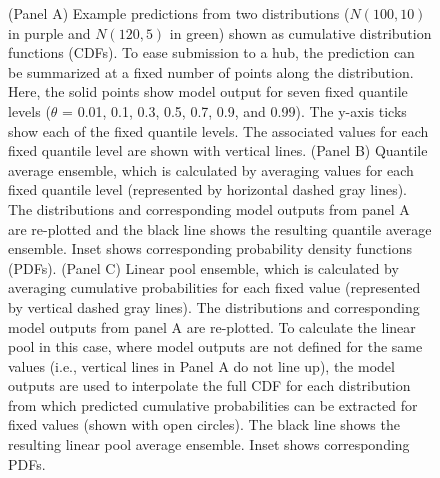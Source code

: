 \documentclass[
  letterpaper,
  DIV=11,
  numbers=noendperiod]{scrartcl}
\begin{document}
\begin{figure}


\caption{\label{fig-example-quantile-average-and-linear-pool}(Panel A)
Example predictions from two distributions (\(N(100, 10)\) in purple and
\(N(120, 5)\) in green) shown as cumulative distribution functions
(CDFs). To ease submission to a hub, the prediction can be summarized at
a fixed number of points along the distribution. Here, the solid points
show model output for seven fixed quantile levels (\(\theta\) = 0.01,
0.1, 0.3, 0.5, 0.7, 0.9, and 0.99). The y-axis ticks show each of the
fixed quantile levels. The associated values for each fixed quantile
level are shown with vertical lines. (Panel B) Quantile average
ensemble, which is calculated by averaging values for each fixed
quantile level (represented by horizontal dashed gray lines). The
distributions and corresponding model outputs from panel A are
re-plotted and the black line shows the resulting quantile average
ensemble. Inset shows corresponding probability density functions
(PDFs). (Panel C) Linear pool ensemble, which is calculated by averaging
cumulative probabilities for each fixed value (represented by vertical
dashed gray lines). The distributions and corresponding model outputs
from panel A are re-plotted. To calculate the linear pool in this case,
where model outputs are not defined for the same values (i.e., vertical
lines in Panel A do not line up), the model outputs are used to
interpolate the full CDF for each distribution from which predicted
cumulative probabilities can be extracted for fixed values (shown with
open circles). The black line shows the resulting linear pool average
ensemble. Inset shows corresponding PDFs.}

\end{figure}%
\end{document}
